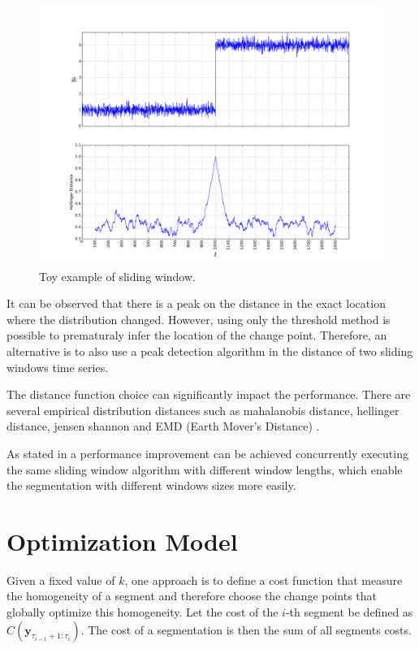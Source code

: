 \begin{figure}[H]
    \centering
    \includegraphics[width=1.0\textwidth]{./figures/sliding_window_toy_example.png}
    \caption{Toy example of sliding window.}
    \label{fig:sliding_window_toy_example}
\end{figure}

It can be observed that there is a peak on the distance in the exact location where the distribution changed. However, using only the threshold method is possible to prematuraly infer the location of the change point. Therefore, an alternative is to also use a peak detection algorithm in the distance of two sliding windows time series.

The distance function choice can significantly impact the performance. There are several empirical distribution distances such as mahalanobis distance, hellinger distance, jensen shannon and EMD (Earth Mover's Distance) \cite{fast_and_robust_earth_movers_distances}.  

As stated in \cite{detecting_change_in_data_streams} a performance improvement can be achieved concurrently executing the same sliding window algorithm with different window lengths, which enable the segmentation with different windows sizes more easily.

\section{Optimization Model}  

Given a fixed value of $k$, one approach is to define a cost function that measure the homogeneity of a segment and therefore choose the change points that globally optimize this homogeneity. Let the cost of the $i$-th segment be defined as $C(\mathbf{y}_{\tau_{i - 1} + 1 : \tau_{i}})$. The cost of a segmentation is then the sum of all segments costs.

